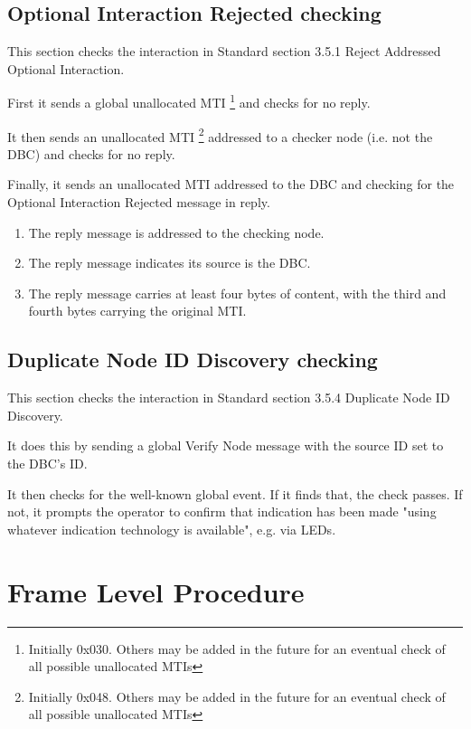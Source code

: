 \subsection{Optional Interaction Rejected checking}

This section checks the interaction in Standard section 3.5.1 Reject Addressed Optional Interaction.

First it sends a global unallocated MTI
\footnote{Initially 0x030. Others may be added in the future for an eventual
    check of all possible unallocated MTIs}
and checks for no reply.

It then sends an unallocated MTI
\footnote{Initially 0x048. Others may be added in the future for an eventual
    check of all possible unallocated MTIs}
addressed to a checker node (i.e. not the DBC)
and checks for no reply.

Finally, it sends an unallocated MTI
addressed to the DBC and checking for the Optional Interaction Rejected 
message in reply.

    \begin{enumerate}
    \item The reply message is addressed to the checking node.
    \item The reply message indicates its source is the DBC.
    \item The reply message carries at least four bytes of content, with the 
            third and fourth bytes carrying the original MTI.
    \end{enumerate}

\subsection{Duplicate Node ID Discovery checking}

This section checks the interaction in Standard section 3.5.4 Duplicate Node ID Discovery.

It does this by sending a global Verify Node message with the source ID set to the DBC's ID.

It then checks for the well-known global event.  If it finds that, the check passes.
If not, it prompts the operator to confirm that indication has been made 
"using whatever indication technology is available", e.g. via LEDs.

\section{Frame Level Procedure}


